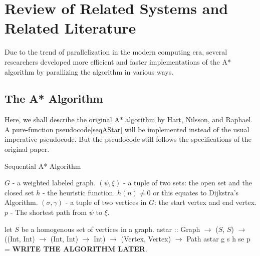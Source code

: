 \chapter{Review of Related Systems and Related Literature}

Due to the trend of parallelization in the modern computing era, \cite{Rios2011,WeinstockHolladay,ZaghloulAlJami2017,Sanz2016}
several researchers developed more efficient and faster implementations 
of the A* algorithm by parallizing the algorithm in various ways.

\section{The A* Algorithm}
Here, we shall describe the original A* algorithm by Hart, Nilsson, and Raphael.\cite{HartNilssonRaphael1968}
A pure-function pseudocode\ref{seqAStar} will be implemented instead of the usual imperative 
pseudocode. But the pseudocode still follows the specifications of the original paper.

\begin{algorithm}
    \caption{Sequential A* Algorithm}
    \label{seqAStar}
    \begin{algorithmic}
        \REQUIRE $G$ - a weighted labeled graph.
        \REQUIRE $(\psi, \xi)$ - a tuple of two sets: the open set and the closed set
        \REQUIRE $h$ - the heuristic function. $h(n)\neq 0$ or this equates to Dijkstra's Algorithm.
        \REQUIRE $(\sigma, \gamma)$ - a tuple of two vertices in $G$: the start vertex and end vertex.
        \ENSURE  $p$ - The shortest path from $\psi$ to $\xi$. 
        
        \STATE let $S$ be a homogenous set of vertices in a graph.
        \STATE astar :: Graph $\rightarrow$ ($S$, $S$) $\rightarrow$ ((Int, Int) 
            $\rightarrow$ (Int, Int) $\rightarrow$ Int) $\rightarrow$ (Vertex, Vertex) $\rightarrow$ Path 
        \STATE astar g s h se p = \textbf{WRITE THE ALGORITHM LATER}.
    \end{algorithmic}
\end{algorithm}


